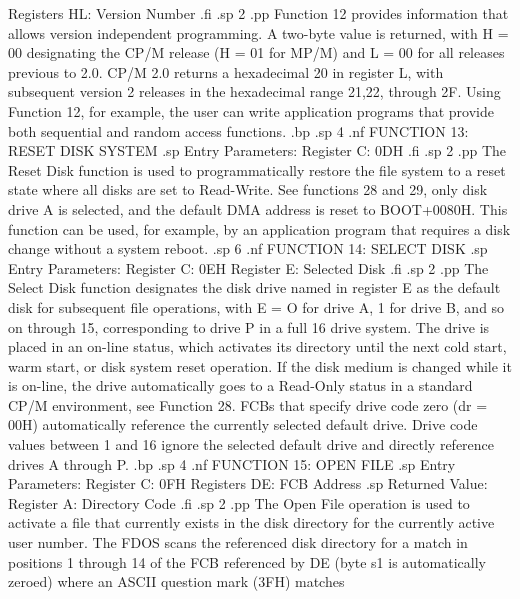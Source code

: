                    Registers HL:  Version Number
.fi
.sp 2
.pp
Function 12 provides information that allows version independent 
programming.  A two-byte value is returned, with H = 00 
designating the CP/M release (H = 01 for MP/M) and L = 00 for 
all releases previous to 2.0.  CP/M 2.0 returns a hexadecimal 20 
in register L, with subsequent version 2 releases in the 
hexadecimal range 21,22, through 2F.  Using Function 12, for 
example, the user can write application programs that provide 
both sequential and random access functions.
.bp 
.sp 4
.nf
                 FUNCTION 13:  RESET DISK SYSTEM
.sp
                    Entry Parameters:
                          Register C:  0DH
.fi
.sp 2
.pp
The Reset Disk function is used to programmatically restore the 
file system to a reset state where all disks are set to 
Read-Write.  See functions 28 and 29, only disk drive A is 
selected, and the default DMA address is reset to BOOT+0080H.  
This function can be used, for example, by an application program 
that requires a disk change without a system reboot.
.sp 6
.nf
                    FUNCTION 14:  SELECT DISK
.sp
                 Entry Parameters:
                       Register C:  0EH
                       Register E:  Selected Disk
.fi
.sp 2
.pp 
The Select Disk function designates the disk drive named in register 
E as the default disk for subsequent file operations, with E = O 
for drive A, 1 for drive B, and so on through 15, corresponding to drive 
P in a full 16 drive system.  The drive is placed in an on-line 
status, which activates its directory until the next cold start, 
warm start, or disk system reset operation.  If the disk medium 
is changed while it is on-line, the drive automatically goes to 
a Read-Only status in a standard CP/M environment, see Function 
28.  FCBs that specify drive code zero (dr = 00H) automatically 
reference the currently selected default drive.  Drive code 
values between 1 and 16 ignore the selected default 
drive and directly reference drives A through P.
.bp
.sp 4
.nf
                     FUNCTION 15:  OPEN FILE
.sp
                Entry Parameters:
                      Register C:  0FH
                    Registers DE:  FCB Address
.sp
                Returned Value:
                     Register  A:  Directory Code
.fi
.sp 2
.pp
The Open File operation is used to activate a file that currently 
exists in the disk directory for the currently active user 
number.  The FDOS scans the referenced disk directory for a match 
in positions 1 through 14 of the FCB referenced by DE (byte s1 is 
automatically zeroed) where an ASCII question mark (3FH) matches 
